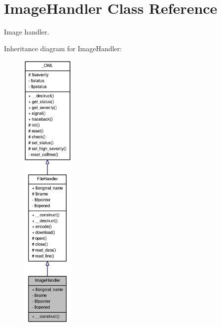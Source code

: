 \section{ImageHandler Class Reference}
\label{classImageHandler}


Image handler.  




Inheritance diagram for ImageHandler:\nopagebreak
\begin{figure}[H]
\begin{center}
\leavevmode
\includegraphics[height=400pt]{classImageHandler__inherit__graph}
\end{center}
\end{figure}


